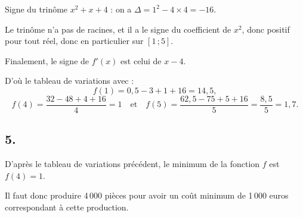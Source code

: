 \documentclass[10pt]{article}
\begin{document}
Signe du trinôme \( x^2 + x + 4 \) : on a \( \Delta = 1^2 - 4 \times 4 = -16 \).

Le trinôme n'a pas de racines, et il a le signe du coefficient de \( x^2 \), donc positif pour tout réel, donc en particulier sur \( [1 \, ; 5] \).

Finalement, le signe de \( f'(x) \) est celui de \( x - 4 \).

D'où le tableau de variations avec :
\[
f(1) = 0{,}5 - 3 + 1 + 16 = 14{,}5,
\] 
\[
f(4) = \dfrac{32 - 48 + 4 + 16}{4} = 1 \quad \text{et} \quad f(5) = \dfrac{62{,}5 - 75 + 5 + 16}{5} = \dfrac{8{,}5}{5} = 1{,}7.
\]

\begin{center}
\end{center}

\subsection*{5.}

D'après le tableau de variations précédent, le minimum de la fonction \( f \) est \( f(4) = 1 \).

Il faut donc produire 4\,000 pièces pour avoir un coût minimum de 1\,000 euros correspondant à cette production.
\end{document}
